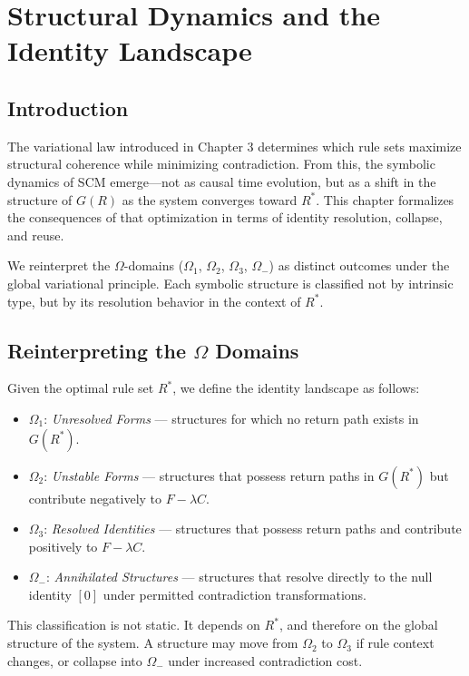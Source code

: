 \chapter{Structural Dynamics and the Identity Landscape}

\section*{Introduction}

The variational law introduced in Chapter 3 determines which rule sets maximize structural coherence while minimizing contradiction. From this, the symbolic dynamics of SCM emerge—not as causal time evolution, but as a shift in the structure of $G(R)$ as the system converges toward $R^*$. This chapter formalizes the consequences of that optimization in terms of identity resolution, collapse, and reuse.

We reinterpret the $\Omega$-domains ($\Omega_1$, $\Omega_2$, $\Omega_3$, $\Omega_-$) as distinct outcomes under the global variational principle. Each symbolic structure is classified not by intrinsic type, but by its resolution behavior in the context of $R^*$.

\section{Reinterpreting the $\Omega$ Domains}

\begin{definition}
Given the optimal rule set $R^*$, we define the identity landscape as follows:
\begin{itemize}
    \item $\Omega_1$: \emph{Unresolved Forms} — structures for which no return path exists in $G(R^*)$.
    \item $\Omega_2$: \emph{Unstable Forms} — structures that possess return paths in $G(R^*)$ but contribute negatively to $F - \lambda C$.
    \item $\Omega_3$: \emph{Resolved Identities} — structures that possess return paths and contribute positively to $F - \lambda C$.
    \item $\Omega_-$: \emph{Annihilated Structures} — structures that resolve directly to the null identity $[0]$ under permitted contradiction transformations.
\end{itemize}
\end{definition}

\noindent
This classification is not static. It depends on $R^*$, and therefore on the global structure of the system. A structure may move from $\Omega_2$ to $\Omega_3$ if rule context changes, or collapse into $\Omega_-$ under increased contradiction cost.

